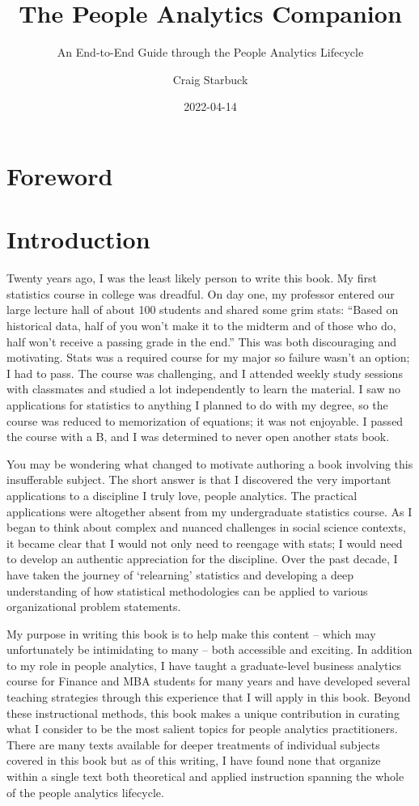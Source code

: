 \documentclass[]{book}
\title{The People Analytics Companion}
\subtitle{An End-to-End Guide through the People Analytics Lifecycle}
\author{Craig Starbuck}
\date{2022-04-14}
\begin{document}
\maketitle

{
\setcounter{tocdepth}{1}
\tableofcontents
}
\hypertarget{foreword}{%
\chapter{Foreword}\label{foreword}}

\hypertarget{intro}{%
\chapter{Introduction}\label{intro}}

Twenty years ago, I was the least likely person to write this book. My first statistics course in college was dreadful. On day one, my professor entered our large lecture hall of about 100 students and shared some grim stats: ``Based on historical data, half of you won't make it to the midterm and of those who do, half won't receive a passing grade in the end.'' This was both discouraging and motivating. Stats was a required course for my major so failure wasn't an option; I had to pass. The course was challenging, and I attended weekly study sessions with classmates and studied a lot independently to learn the material. I saw no applications for statistics to anything I planned to do with my degree, so the course was reduced to memorization of equations; it was not enjoyable. I passed the course with a B, and I was determined to never open another stats book.

You may be wondering what changed to motivate authoring a book involving this insufferable subject. The short answer is that I discovered the very important applications to a discipline I truly love, people analytics. The practical applications were altogether absent from my undergraduate statistics course. As I began to think about complex and nuanced challenges in social science contexts, it became clear that I would not only need to reengage with stats; I would need to develop an authentic appreciation for the discipline. Over the past decade, I have taken the journey of `relearning' statistics and developing a deep understanding of how statistical methodologies can be applied to various organizational problem statements.

My purpose in writing this book is to help make this content -- which may unfortunately be intimidating to many -- both accessible and exciting. In addition to my role in people analytics, I have taught a graduate-level business analytics course for Finance and MBA students for many years and have developed several teaching strategies through this experience that I will apply in this book. Beyond these instructional methods, this book makes a unique contribution in curating what I consider to be the most salient topics for people analytics practitioners. There are many texts available for deeper treatments of individual subjects covered in this book but as of this writing, I have found none that organize within a single text both theoretical and applied instruction spanning the whole of the people analytics lifecycle.
\end{document}
